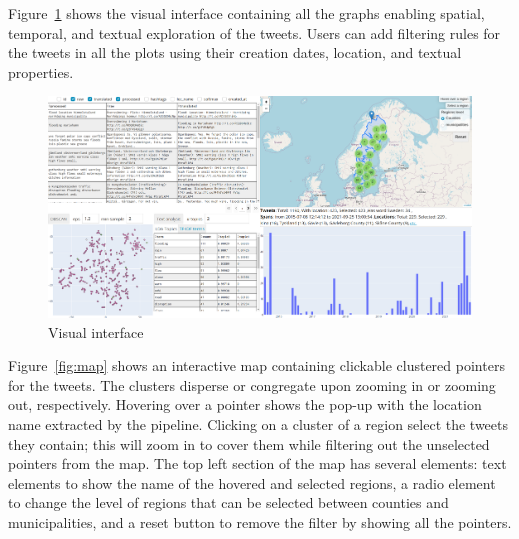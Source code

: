 Figure~\ref{fig:visual_interface} shows the visual interface containing all the graphs enabling spatial, temporal, and
textual exploration of the tweets. Users can add filtering rules for the tweets in all the plots
using their creation dates, location, and textual properties.

\begin{figure}[H]
\begin{center}
  \includegraphics[width=\columnwidth]{./images/visual_interface.png}
\end{center}
\caption{Visual interface}
\label{fig:visual_interface}
\end{figure}


Figure~\ref{fig:map} shows an interactive map containing clickable clustered pointers for the
tweets. The clusters disperse or congregate upon zooming in or zooming out, respectively. Hovering
over a pointer shows the pop-up with the location name extracted by the pipeline. Clicking on a
cluster of a region select the tweets they contain; this will zoom in to cover them while filtering
out the unselected pointers from the map. The top left section of the map has several elements: text
elements to show the name of the hovered and selected regions, a radio element to change the level
of regions that can be selected between counties and municipalities, and a reset button to remove
the filter by showing all the pointers.

